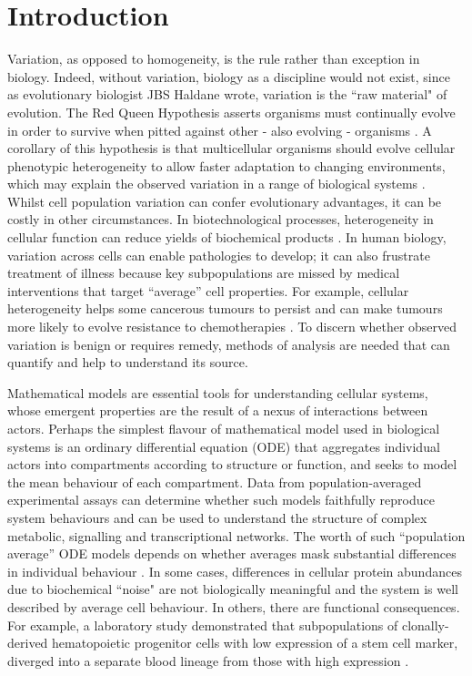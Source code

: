 \section{Introduction}
Variation, as opposed to homogeneity, is the rule rather than exception in biology. Indeed, without variation, biology as a discipline would not exist, since as evolutionary biologist JBS Haldane wrote, variation is the ``raw material" of evolution. The Red Queen Hypothesis asserts organisms must continually evolve in order to survive when pitted against other - also evolving - organisms \cite{ridley1994red}. A corollary of this hypothesis is that multicellular organisms should evolve cellular phenotypic heterogeneity to allow faster adaptation to changing environments, which may explain the observed variation in a range of biological systems \cite{fraser2009chance}. Whilst cell population variation can confer evolutionary advantages, it can be costly in other circumstances. In biotechnological processes, heterogeneity in cellular function can reduce yields of biochemical products \cite{delvigne2014metabolic}. In human biology, variation across cells can enable pathologies to develop; it can also frustrate treatment of illness because key subpopulations are missed by medical interventions that target ``average'' cell properties. For example, cellular heterogeneity helps some cancerous tumours to persist \cite{gatenby2007cellular} and can make tumours more likely to evolve resistance to chemotherapies \cite{altrock2015mathematics}. To discern whether observed variation is benign or requires remedy, methods of analysis are needed that can quantify and help to understand its source.

Mathematical models are essential tools for understanding cellular systems, whose emergent properties are the result of a nexus of interactions between actors. Perhaps the simplest flavour of mathematical model used in biological systems is an ordinary differential equation (ODE) that aggregates individual actors into compartments according to structure or function, and seeks to model the mean behaviour of each compartment. Data from population-averaged experimental assays can determine whether such models faithfully reproduce system behaviours and can be used to understand the structure of complex metabolic, signalling and transcriptional networks. The worth of such ``population average'' ODE models depends on whether averages mask substantial differences in individual behaviour \cite{altschuler2010cellular}. In some cases, differences in cellular protein abundances due to biochemical ``noise" are not biologically meaningful \cite{elowitz2002stochastic} and the system is well described by average cell behaviour. In others, there are functional consequences. For example, a laboratory study demonstrated that subpopulations of clonally-derived hematopoietic progenitor cells with low expression of a stem cell marker, diverged into a separate blood lineage from those with high expression \cite{chang2008transcriptome}.

